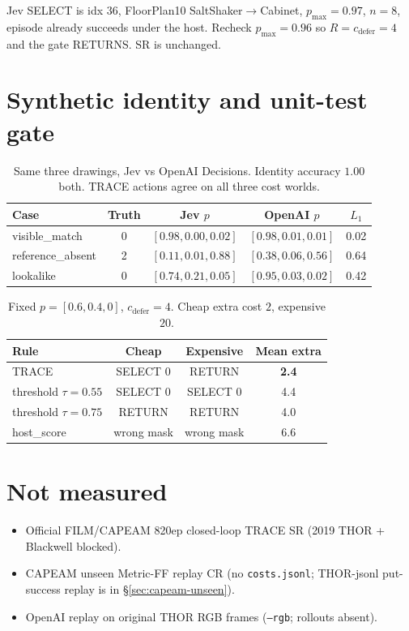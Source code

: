 \documentclass[11pt]{article}
\begin{document}
Jev SELECT is idx $36$, FloorPlan10 SaltShaker$\to$Cabinet, $p_{\max}{=}0.97$, $n{=}8$, episode already succeeds under the host. Recheck $p_{\max}{=}0.96$ so $R{=}c_{\mathrm{defer}}{=}4$ and the gate RETURNS. SR is unchanged.

\section{Synthetic identity and unit-test gate}
\label{sec:live}

\begin{table}[t]
\centering
\caption{Same three drawings, Jev vs OpenAI Decisions. Identity accuracy $1.00$ both. TRACE actions agree on all three cost worlds.}
\label{tab:identity}
\scriptsize
\begin{tabular}{lcccc}
\toprule
Case & Truth & Jev $p$ & OpenAI $p$ & $L_1$ \\
\midrule
visible\_match & 0 & $[0.98,0.00,0.02]$ & $[0.98,0.01,0.01]$ & 0.02 \\
reference\_absent & 2 & $[0.11,0.01,0.88]$ & $[0.38,0.06,0.56]$ & 0.64 \\
lookalike & 0 & $[0.74,0.21,0.05]$ & $[0.95,0.03,0.02]$ & 0.42 \\
\bottomrule
\end{tabular}
\end{table}

\begin{table}[t]
\centering
\caption{Fixed $p{=}[0.6,0.4,0]$, $c_{\mathrm{defer}}{=}4$. Cheap extra cost $2$, expensive $20$.}
\label{tab:offline-rules}
\scriptsize
\begin{tabular}{lccc}
\toprule
Rule & Cheap & Expensive & Mean extra \\
\midrule
TRACE & SELECT $0$ & RETURN & \textbf{2.4} \\
threshold $\tau{=}0.55$ & SELECT $0$ & SELECT $0$ & 4.4 \\
threshold $\tau{=}0.75$ & RETURN & RETURN & 4.0 \\
host\_score & wrong mask & wrong mask & 6.6 \\
\bottomrule
\end{tabular}
\end{table}

\section{Not measured}
\label{sec:missing}
\begin{itemize}
\item Official FILM/CAPEAM 820ep closed-loop TRACE SR (2019 THOR + Blackwell blocked).
\item CAPEAM unseen Metric-FF replay CR (no \texttt{costs.jsonl}; THOR-jsonl put-success replay is in \S\ref{sec:capeam-unseen}).
\item OpenAI replay on original THOR RGB frames (\texttt{--rgb}; rollouts absent).
\end{itemize}
\end{document}

